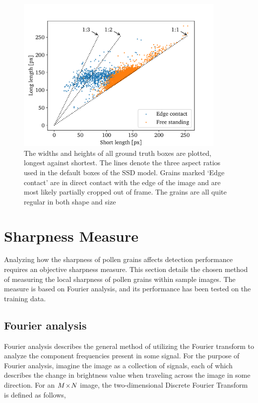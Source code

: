 \begin{figure}[htb]
  \centering
  \includegraphics[width=0.9\textwidth]{figs/method/aspect_ratio.pdf}
  \caption[Aspect ratios in the dataset]{The widths and heights of all ground truth boxes are plotted, longest against shortest.
The lines denote the three aspect ratios used in the default boxes of the SSD model.
Grains marked `Edge contact' are in direct contact with the edge of the image and are most likely partially cropped out of frame.
The grains are all quite regular in both shape and size}\label{fig:aspect}
\end{figure}

\section{Sharpness Measure}\label{sec:method-sharpness}
Analyzing how the sharpness of pollen grains affects detection performance requires an objective sharpness measure.
This section details the chosen method of measuring the local sharpness of pollen grains within sample images.
The measure is based on Fourier analysis, and its performance has been tested on the training data.

\subsection{Fourier analysis}
Fourier analysis describes the general method of utilizing the Fourier transform to analyze the component frequencies present in some signal.
For the purpose of Fourier analysis, imagine the image as a collection of signals, each of which describes the change in brightness value when traveling across the image in some direction.
For an \(M\!\times \! N\) image, the two-dimensional Discrete Fourier Transform is defined as follows,

